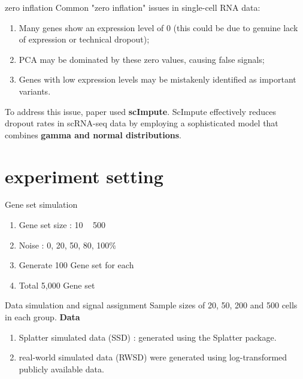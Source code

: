\documentclass[12pt, aspectratio=43]{beamer}
\begin{document}
	\begin{frame}{zero inflation}
		Common "zero inflation" issues in single-cell RNA data:
		\begin{enumerate}
			\item Many genes show an expression level of 0 (this could be due to genuine lack of expression or technical dropout);
			\item PCA may be dominated by these zero values, causing false signals;
			\item Genes with low expression levels may be mistakenly identified as important variants.
		\end{enumerate}
		To address this issue, paper used \textbf{scImpute}. 
		\vskip 0.2cm
		ScImpute effectively reduces dropout rates in scRNA-seq data by employing a sophisticated model that combines \textbf{gamma and normal distributions}.
	\end{frame}
	
	\section{experiment setting}
	
	\begin{frame}{Gene set simulation}
		\begin{enumerate}
			\item Gene set size : 10 ~ 500
			\item Noise : 0, 20, 50, 80, 100$\%$
			\item Generate 100 Gene set for each
			\item Total 5,000 Gene set
		\end{enumerate}
	\end{frame}
	
	\begin{frame}{Data simulation and signal assignment}
		Sample sizes of 20, 50, 200 and 500 cells in each group.
		\vskip 0.2cm
		\textbf{Data}
		\begin{enumerate}
			\item Splatter simulated data (SSD) : generated using the Splatter package.
			\item real-world simulated data (RWSD) were generated using log-transformed publicly available data.
		\end{enumerate}
	\end{frame}
	
\end{document}
